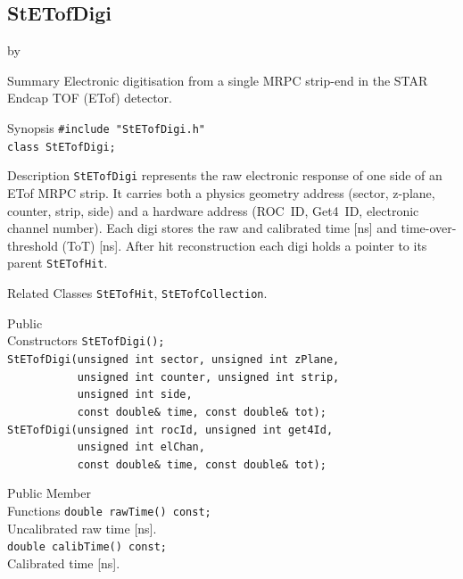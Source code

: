 \documentclass[twoside]{article}
\newcommand{\entrylabel}[1]{\mbox{\textbf{{#1}}}\hfil}%
\newenvironment{entry}
{\begin{list}{}%
    {\renewcommand{\makelabel}{\entrylabel}%
     \setlength{\labelwidth}{90pt}%
     \setlength{\leftmargin}{\labelwidth}
     \advance\leftmargin by \labelsep%
      }%
    }%
  {\end{list}}
\newcommand{\Entrylabel}[1]%
{\raisebox{0pt}[1ex][0pt]{\makebox[\labelwidth][l]%
    {\parbox[t]{\labelwidth}{\hspace{0pt}\textbf{{#1}}}}}}
\newenvironment{Entry}%
{\renewcommand{\entrylabel}{\Entrylabel}\begin{entry}}%
  {\end{entry}}
\begin{document}
\subsection{StETofDigi}
\label{sec:StETofDigi}
\begin{Entry}
\item[Summary] Electronic digitisation from a single MRPC strip-end in the
    STAR Endcap TOF (ETof) detector.
\item[Synopsis]
    \verb+#include "StETofDigi.h"+\\
    \verb+class StETofDigi;+\\
\item[Description]
    \texttt{StETofDigi} represents the raw electronic response of one side of
    an ETof MRPC strip.  It carries both a physics geometry address (sector,
    z-plane, counter, strip, side) and a hardware address (ROC~ID, Get4~ID,
    electronic channel number).  Each digi stores the raw and calibrated time
    [ns] and time-over-threshold (ToT) [ns].  After hit reconstruction each
    digi holds a pointer to its parent \texttt{StETofHit}.
\item[Related Classes]
    \texttt{StETofHit}, \texttt{StETofCollection}.
\item[Public\\ Constructors]
    \verb+StETofDigi();+\\
    \verb+StETofDigi(unsigned int sector, unsigned int zPlane,+\\
    \verb+           unsigned int counter, unsigned int strip,+\\
    \verb+           unsigned int side,+\\
    \verb+           const double& time, const double& tot);+\\
    \verb+StETofDigi(unsigned int rocId, unsigned int get4Id,+\\
    \verb+           unsigned int elChan,+\\
    \verb+           const double& time, const double& tot);+\\
\item[Public Member\\ Functions]
    \verb+double rawTime() const;+\\
    Uncalibrated raw time [ns].\\
    \verb+double calibTime() const;+\\
    Calibrated time [ns].\\

\end{Entry}
\end{document}
